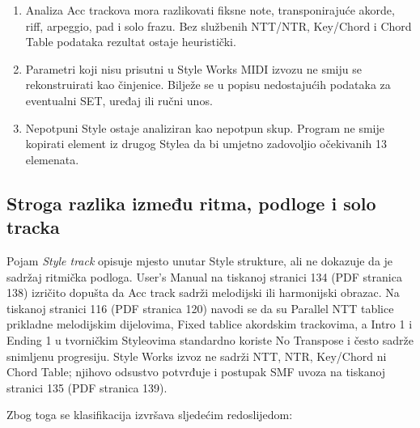 \documentclass[11pt]{article}
\begin{document}
\begin{enumerate}[label=S\arabic*.]
    \item Analiza Acc trackova mora razlikovati fiksne note, transponirajuće
    akorde, riff, arpeggio, pad i solo frazu. Bez službenih NTT/NTR, Key/Chord i
    Chord Table podataka rezultat ostaje heuristički.

    \item Parametri koji nisu prisutni u Style Works MIDI izvozu ne smiju se
    rekonstruirati kao činjenice. Bilježe se u popisu nedostajućih podataka za
    eventualni SET, uređaj ili ručni unos.

    \item Nepotpuni Style ostaje analiziran kao nepotpun skup. Program ne smije
    kopirati element iz drugog Stylea da bi umjetno zadovoljio očekivanih 13
    elemenata.
\end{enumerate}

\subsection{Stroga razlika između ritma, podloge i solo tracka}

Pojam \emph{Style track} opisuje mjesto unutar Style strukture, ali ne dokazuje
da je sadržaj ritmička podloga. User's Manual na tiskanoj stranici 134
(PDF stranica 138) izričito dopušta da Acc track sadrži melodijski ili
harmonijski obrazac. Na tiskanoj stranici 116 (PDF stranica 120) navodi se da su
Parallel NTT tablice prikladne melodijskim dijelovima, Fixed tablice akordskim
trackovima, a Intro 1 i Ending 1 u tvorničkim Styleovima standardno koriste
No Transpose i često sadrže snimljenu progresiju. Style Works izvoz ne sadrži
NTT, NTR, Key/Chord ni Chord Table; njihovo odsustvo potvrđuje i postupak SMF
uvoza na tiskanoj stranici 135 (PDF stranica 139).

Zbog toga se klasifikacija izvršava sljedećim redoslijedom:
\end{document}
